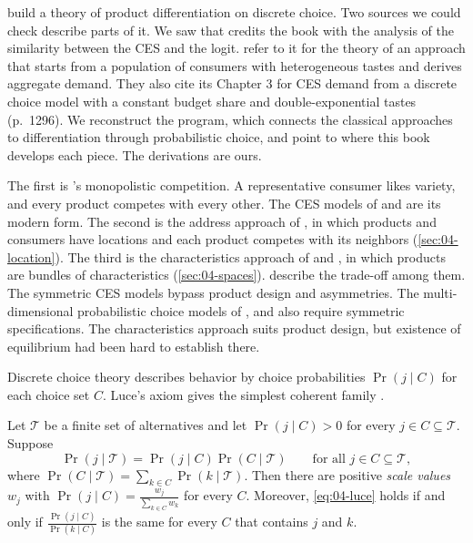  build a theory of product differentiation on discrete choice. Two sources we
could check describe parts of it. We saw that \citet[n.~29]{Hausman1997} credits the book with the analysis of the
similarity between the CES and the logit. \citet[p.~1282]{AndersonDePalmaNesterov1995} refer to it for the theory of an
approach that starts from a population of consumers with heterogeneous tastes and derives aggregate demand. They
also cite its Chapter 3 for CES demand from a discrete choice model with a constant budget share and
double-exponential tastes (p.~1296). We reconstruct the program, which connects the classical approaches to
differentiation through probabilistic choice, and point to where this book develops each piece. The derivations
are ours.

 The first is \citeauthor{Chamberlin1933}'s
\citeyearpar{Chamberlin1933} monopolistic competition. A representative consumer likes variety, and every product
competes with every other. The CES models of \citet{Spence1976} and \citet{DixitStiglitz1977} are its modern form.
The second is the address approach of \citet{Hotelling1929}, in which products and consumers have locations and
each product competes with its neighbors (\cref{sec:04-location}). The third is the characteristics approach of
\citet{Lancaster1966} and \citet{Gorman1980}, in which products are bundles of characteristics (\cref{sec:04-spaces}).
 describe the trade-off among them. The symmetric CES models bypass product design
and asymmetries. The multi-dimensional probabilistic choice models of \citet{PerloffSalop1985},
\citet{AndersonDePalma1988} and \citet{AndersonDePalmaThisse1988b,AndersonDePalmaThisse1989} also require symmetric
specifications. The characteristics approach suits product design, but existence of equilibrium had been hard to
establish there.

 Discrete choice theory describes behavior by choice probabilities $\Pr(j \mid C)$
for each choice set $C$. Luce's axiom gives the simplest coherent family \citep{Luce1959}.

\begin{lemma}\label{lem:04-luce}
Let $\mathcal{T}$ be a finite set of alternatives and let $\Pr(j \mid C) > 0$ for every $j \in C \subseteq \mathcal{T}$. Suppose
\begin{equation}\label{eq:04-luce}
\Pr(j \mid \mathcal{T}) = \Pr(j \mid C)\Pr(C \mid \mathcal{T}) \qquad\text{for all } j \in C \subseteq \mathcal{T},
\end{equation}
where $\Pr(C \mid \mathcal{T}) = \sum_{k\in C}\Pr(k \mid \mathcal{T})$. Then there are positive \emph{scale values} $w_j$ with
$\Pr(j \mid C) = \frac{w_j}{\sum_{k\in C}w_k}$ for every $C$. Moreover, \eqref{eq:04-luce} holds if and
only if $\frac{\Pr(j \mid C)}{\Pr(k \mid C)}$ is the same for every $C$ that contains $j$ and $k$.
\end{lemma}

